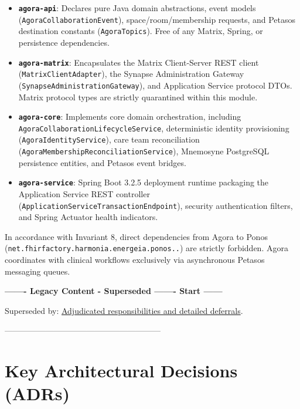 \begin{itemize}
    \item \textbf{\texttt{agora-api}}: Declares pure Java domain abstractions, event models (\nolinkurl{AgoraCollaborationEvent}), space/room/membership requests, and Petasos destination constants (\nolinkurl{AgoraTopics}). Free of any Matrix, Spring, or persistence dependencies.
    \item \textbf{\texttt{agora-matrix}}: Encapsulates the Matrix Client-Server REST client (\nolinkurl{MatrixClientAdapter}), the Synapse Administration Gateway (\nolinkurl{SynapseAdministrationGateway}), and Application Service protocol DTOs. Matrix protocol types are strictly quarantined within this module.
    \item \textbf{\texttt{agora-core}}: Implements core domain orchestration, including \nolinkurl{AgoraCollaborationLifecycleService}, deterministic identity provisioning (\nolinkurl{AgoraIdentityService}), care team reconciliation (\nolinkurl{AgoraMembershipReconciliationService}), Mnemosyne PostgreSQL persistence entities, and Petasos event bridges.
    \item \textbf{\texttt{agora-service}}: Spring Boot 3.2.5 deployment runtime packaging the Application Service REST controller (\nolinkurl{ApplicationServiceTransactionEndpoint}), security authentication filters, and Spring Actuator health indicators.
\end{itemize}

\begin{archinote}
In accordance with Invariant 8, direct dependencies from Agora to Ponos (\nolinkurl{net.fhirfactory.harmonia.energeia.ponos..}) are strictly forbidden. Agora coordinates with clinical workflows exclusively via asynchronous Petasos messaging queues.
\end{archinote}


\par\noindent\textbf{------- Legacy Content - Superseded ------- Start ------}
\par\noindent Superseded by: \href{../../markdown/05-information-systems-architecture/agora-omilia-collaboration.md\#deferred-collaboration-design}{Adjudicated responsibilities and detailed deferrals}.
\par\noindent ---------------------------------------------------------

\section{Key Architectural Decisions (ADRs)}


